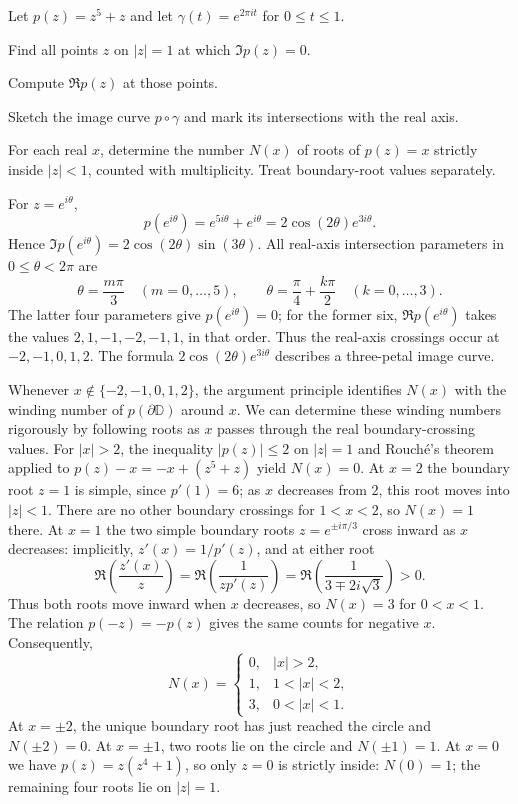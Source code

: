 \begin{problem}[CP-IV-0052]
\label{prob:cp-iv-0052}
Let $p(z)=z^5+z$ and let $\gamma(t)=e^{2\pi it}$ for $0\le t\le1$.
\par\noindent\textbullet\quad Find all points $z$ on $|z|=1$ at which $\Im p(z)=0$.
\par\noindent\textbullet\quad Compute $\Re p(z)$ at those points.
\par\noindent\textbullet\quad Sketch the image curve $p\circ\gamma$ and mark its intersections with the real axis.
\par\noindent\textbullet\quad For each real $x$, determine the number $N(x)$ of roots of $p(z)=x$ strictly inside $|z|<1$, counted with multiplicity. Treat boundary-root values separately.
\end{problem}



\begin{solution}
For $z=e^{i\theta}$,
\[
p(e^{i\theta})=e^{5i\theta}+e^{i\theta}
=2\cos(2\theta)e^{3i\theta}.
\]
Hence $\Im p(e^{i\theta})=2\cos(2\theta)\sin(3\theta)$.
All real-axis intersection parameters in $0\le\theta<2\pi$ are
\[
\theta=\frac{m\pi}{3}\quad(m=0,\ldots,5),
\qquad
\theta=\frac{\pi}{4}+\frac{k\pi}{2}\quad(k=0,\ldots,3).
\]
The latter four parameters give $p(e^{i\theta})=0$; for the former six,
$\Re p(e^{i\theta})$ takes the values
$2,1,-1,-2,-1,1$, in that order.
Thus the real-axis crossings occur at $-2,-1,0,1,2$.
The formula $2\cos(2\theta)e^{3i\theta}$ describes a three-petal image curve.

Whenever $x\notin\{-2,-1,0,1,2\}$, the argument principle identifies $N(x)$
with the winding number of $p(\partial\mathbb D)$ around $x$.
We can determine these winding numbers rigorously by following roots as $x$
passes through the real boundary-crossing values.
For $|x|>2$, the inequality $|p(z)|\le2$ on $|z|=1$ and Rouch\'e's
theorem applied to $p(z)-x=-x+(z^5+z)$ yield $N(x)=0$.
At $x=2$ the boundary root $z=1$ is simple, since $p'(1)=6$;
as $x$ decreases from $2$, this root moves into $|z|<1$.
There are no other boundary crossings for $1<x<2$, so $N(x)=1$ there.
At $x=1$ the two simple boundary roots $z=e^{\pm i\pi/3}$ cross inward
as $x$ decreases: implicitly, $z'(x)=1/p'(z)$, and at either root
\[
\Re\!\left(\frac{z'(x)}{z}\right)
=\Re\!\left(\frac{1}{zp'(z)}\right)
=\Re\!\left(\frac{1}{3\mp2i\sqrt3}\right)>0.
\]
Thus both roots move inward when $x$ decreases, so $N(x)=3$ for $0<x<1$.
The relation $p(-z)=-p(z)$ gives the same counts for negative $x$.
Consequently,
\[
\boxed{N(x)=
\begin{cases}
0,&|x|>2,\\
1,&1<|x|<2,\\
3,&0<|x|<1.
\end{cases}}
\]
At $x=\pm2$, the unique boundary root has just reached the circle and
$N(\pm2)=0$. At $x=\pm1$, two roots lie on the circle and $N(\pm1)=1$.
At $x=0$ we have $p(z)=z(z^4+1)$, so only $z=0$ is strictly inside:
$N(0)=1$; the remaining four roots lie on $|z|=1$.
\end{solution}


